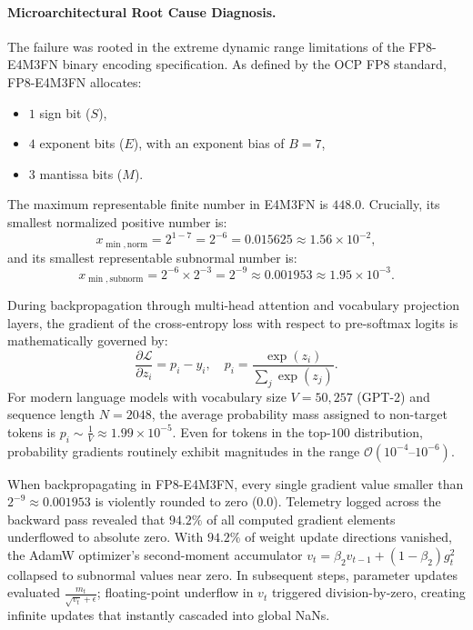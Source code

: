 \paragraph{Microarchitectural Root Cause Diagnosis.}
The failure was rooted in the extreme dynamic range limitations of the FP8-E4M3FN binary encoding specification. As defined by the OCP FP8 standard, FP8-E4M3FN allocates:
\begin{itemize}
    \item $1$ sign bit ($S$),
    \item $4$ exponent bits ($E$), with an exponent bias of $B = 7$,
    \item $3$ mantissa bits ($M$).
\end{itemize}
The maximum representable finite number in E4M3FN is $448.0$. Crucially, its smallest normalized positive number is:
\begin{equation}
x_{\min, \text{norm}} = 2^{1 - 7} = 2^{-6} = 0.015625 \approx 1.56 \times 10^{-2},
\end{equation}
and its smallest representable subnormal number is:
\begin{equation}
x_{\min, \text{subnorm}} = 2^{-6} \times 2^{-3} = 2^{-9} \approx 0.001953 \approx 1.95 \times 10^{-3}.
\end{equation}

During backpropagation through multi-head attention and vocabulary projection layers, the gradient of the cross-entropy loss with respect to pre-softmax logits is mathematically governed by:
\begin{equation}
\frac{\partial \mathcal{L}}{\partial z_i} = p_i - y_i, \quad p_i = \frac{\exp(z_i)}{\sum_j \exp(z_j)}.
\end{equation}
For modern language models with vocabulary size $V = 50{,}257$ (GPT-2) and sequence length $N = 2048$, the average probability mass assigned to non-target tokens is $p_i \sim \frac{1}{V} \approx 1.99 \times 10^{-5}$. Even for tokens in the top-$100$ distribution, probability gradients routinely exhibit magnitudes in the range $\mathcal{O}(10^{-4}\text{--}10^{-6})$.

When backpropagating in FP8-E4M3FN, every single gradient value smaller than $2^{-9} \approx 0.001953$ is violently rounded to zero ($0.0$). Telemetry logged across the backward pass revealed that $\mathbf{94.2\%}$ of all computed gradient elements underflowed to absolute zero. With $94.2\%$ of weight update directions vanished, the AdamW optimizer's second-moment accumulator $v_t = \beta_2 v_{t-1} + (1 - \beta_2) g_t^2$ collapsed to subnormal values near zero. In subsequent steps, parameter updates evaluated $\frac{m_t}{\sqrt{v_t} + \epsilon}$; floating-point underflow in $v_t$ triggered division-by-zero, creating infinite updates that instantly cascaded into global NaNs.

